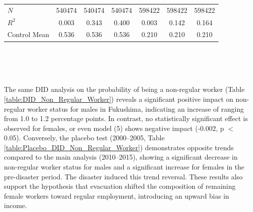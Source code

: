\documentclass[a4paper,12pt]{article}
\begin{document}
\begin{table}[htbp]
{\begin{tabular}{@{}l*{6}{c}@{}}
$\textit{N}$&   540474         &   540474         &   540474         &   598422         &   598422         &   598422         \\
$\textit{R}^2$&    0.003         &    0.343         &    0.400         &    0.003         &    0.142         &    0.164         \\
Control Mean&    0.536         &    0.536         &    0.536         &    0.210         &    0.210         &    0.210         \\
\bottomrule
\end{tabular}}
\\\\
\\

\label{table:DID_OLS}

\end{table}




The same DID analysis on the probability of being a non-regular worker (Table \ref{table:DID_Non_Regular_Worker}) reveals a significant positive impact on non-regular worker status for males in Fukushima, indicating an increase of ranging from 1.0 to 1.2 percentage points. In contrast, no statistically significant effect is observed for females, or even model (5) shows negative impact (-0.002, p $<$ 0.05). Conversely, the placebo test (2000--2005, Table \ref{table:Placebo_DID_Non_Regular_Worker}) demonstrates opposite trends compared to the main analysis (2010--2015), showing a significant decrease in non-regular worker status for males and a significant increase for females in the pre-disaster period. The disaster induced this trend reversal. These results also support the hypothesis that evacuation shifted the composition of remaining female workers toward regular employment, introducing an upward bias in income.
\end{document}
